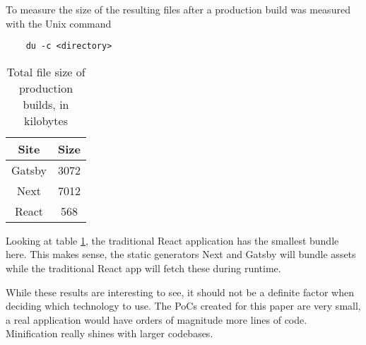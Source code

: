To measure the size of the resulting files after a production build was measured with the Unix command 

\begin{verbatim}
	du -c <directory>
\end{verbatim}

\begin{table}[htb!]
	\begin{center}
		\begin{tabular}{||c c||} 
			\hline
			Site   & Size \\ [0.5ex] 
			\hline\hline
			Gatsby & 3072 \\ 
			\hline
			Next   & 7012 \\
			\hline
			React  & 568  \\[1ex] 
			\hline
		\end{tabular}
		\caption{Total file size of production builds, in kilobytes }
		\label{tbl:bundle_size}
	\end{center}
\end{table}

Looking at table \ref{tbl:bundle_size}, the traditional React application has the smallest bundle here. 
This makes sense, the static generators Next and Gatsby will bundle assets while the traditional React app will fetch these during runtime.

While these results are interesting to see, it should not be a definite factor when deciding which technology to use.
The PoCs created for this paper are very small, a real application would have orders of magnitude more lines of code.
Minification really shines with larger codebases. 